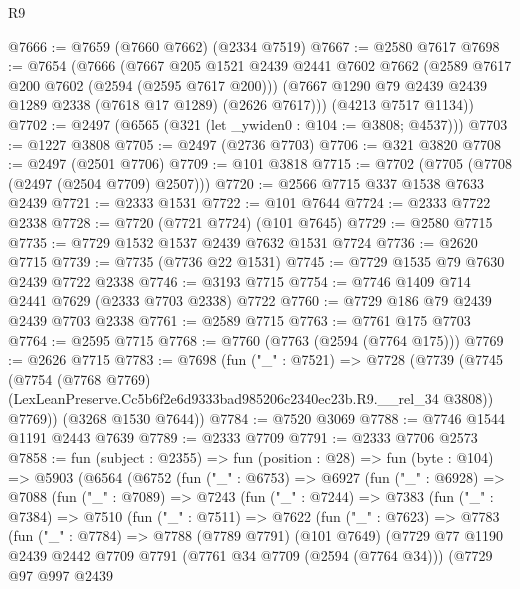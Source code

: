 \begin{lexlean}{R9}
\begin{coremodule}
@7666 := @7659 (@7660 @7662) (@2334 @7519)
@7667 := @2580 @7617
@7698 := @7654
    (@7666
      (@7667
        @205
        @1521
        @2439
        @2441
        @7602
        @7662
        (@2589 @7617 @200 @7602 (@2594 (@2595 @7617 @200)))
        (@7667 @1290 @79 @2439 @2439 @1289 @2338 (@7618 @17 @1289) (@2626 @7617)))
      (@4213 @7517 @1134))
@7702 := @2497 (@6565 (@321 (let _ywiden0 : @104 := @3808; @4537)))
@7703 := @1227 @3808
@7705 := @2497 (@2736 @7703)
@7706 := @321 @3820
@7708 := @2497 (@2501 @7706)
@7709 := @101 @3818
@7715 := @7702 (@7705 (@7708 (@2497 (@2504 @7709) @2507)))
@7720 := @2566 @7715 @337 @1538 @7633 @2439
@7721 := @2333 @1531
@7722 := @101 @7644
@7724 := @2333 @7722 @2338
@7728 := @7720 (@7721 @7724) (@101 @7645)
@7729 := @2580 @7715
@7735 := @7729 @1532 @1537 @2439 @7632 @1531 @7724
@7736 := @2620 @7715
@7739 := @7735 (@7736 @22 @1531)
@7745 := @7729 @1535 @79 @7630 @2439 @7722 @2338
@7746 := @3193 @7715
@7754 := @7746 @1409 @714 @2441 @7629 (@2333 @7703 @2338) @7722
@7760 := @7729 @186 @79 @2439 @2439 @7703 @2338
@7761 := @2589 @7715
@7763 := @7761 @175 @7703
@7764 := @2595 @7715
@7768 := @7760 (@7763 (@2594 (@7764 @175)))
@7769 := @2626 @7715
@7783 := @7698
    (fun ("_" : @7521) =>
    @7728
      (@7739
        (@7745
          (@7754
            (@7768 @7769)
            (LexLeanPreserve.Cc5b6f2e6d9333bad985206c2340ec23b.R9.__rel_34 @3808))
          @7769))
      (@3268 @1530 @7644))
@7784 := @7520 @3069
@7788 := @7746 @1544 @1191 @2443 @7639
@7789 := @2333 @7709
@7791 := @2333 @7706 @2573
@7858 := fun (subject : @2355) =>
  fun (position : @28) =>
  fun (byte : @104) =>
  @5903
    (@6564
      (@6752
        (fun ("_" : @6753) =>
        @6927
          (fun ("_" : @6928) =>
          @7088
            (fun ("_" : @7089) =>
            @7243
              (fun ("_" : @7244) =>
              @7383
                (fun ("_" : @7384) =>
                @7510
                  (fun ("_" : @7511) =>
                  @7622
                    (fun ("_" : @7623) =>
                    @7783
                      (fun ("_" : @7784) =>
                      @7788
                        (@7789 @7791)
                        (@101 @7649)
                        (@7729
                          @77
                          @1190
                          @2439
                          @2442
                          @7709
                          @7791
                          (@7761 @34 @7709 (@2594 (@7764 @34)))
                          (@7729
                            @97
                            @997
                            @2439

\end{coremodule}
\end{lexlean}
